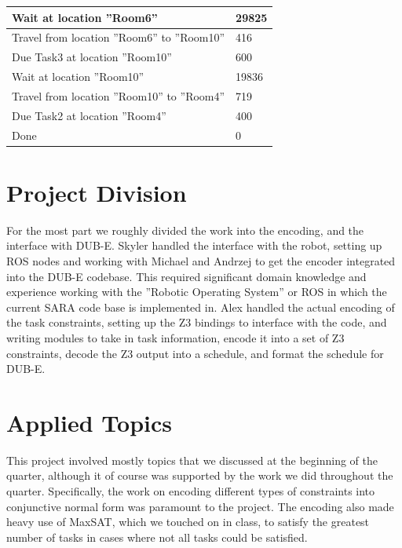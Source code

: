 \documentclass[11pt]{article}
\begin{document}
\begin{center}
\begin{tabular}{ | p{7.5cm} | p{4.5cm} |}
    Wait at location ''Room6'' & 29825 \\ \hline
    Travel from location ''Room6'' to ''Room10'' & 416 \\ \hline
    Due Task3 at location ''Room10'' & 600 \\ \hline
    
    Wait at location ''Room10'' & 19836 \\ \hline
    Travel from location ''Room10'' to ''Room4'' & 719 \\ \hline
    Due Task2 at location ''Room4'' & 400 \\ \hline
    
    Done & 0 \\ \hline
    \end{tabular}
\end{center}

\section{Project Division}
For the most part we roughly divided the work into the encoding,
and the interface with DUB-E.
Skyler handled the interface with the robot,
setting up ROS nodes and working with Michael and Andrzej
to get the encoder integrated
into the DUB-E codebase. This required significant
domain knowledge and experience working with the
''Robotic Operating System'' or ROS in which the
current SARA code base is implemented in.
Alex handled the actual encoding of the task constraints,
setting up the Z3 bindings to interface with the code,
and writing modules to take in task information,
encode it into a set of Z3 constraints,
decode the Z3 output into a schedule,
and format the schedule for DUB-E.


\section{Applied Topics}
This project involved mostly topics
that we discussed at the beginning of the quarter,
although it of course was supported by
the work we did throughout the quarter.
Specifically, the work on encoding different types of constraints
into conjunctive normal form was paramount to the project.
The encoding also made heavy use of MaxSAT,
which we touched on in class,
to satisfy the greatest number of tasks
in cases where not all tasks could be satisfied.
\end{document}
